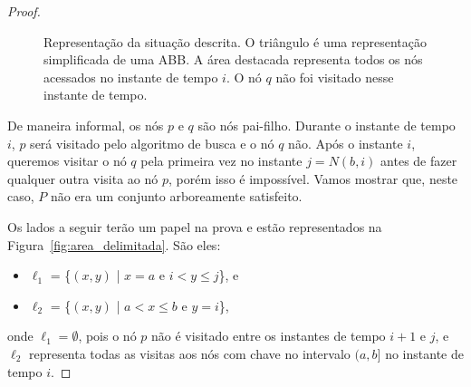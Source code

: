 \begin{proof}
\begin{figure}[H]
    \caption{Representação da situação descrita. O triângulo é uma representação simplificada de uma ABB. A área destacada representa todos os nós acessados no instante de tempo $i$. O nó $q$ não foi visitado nesse instante de tempo.}
\label{fig:representacao_grafica}
\end{figure}

De maneira informal, os nós $p$ e $q$ são nós pai-filho. Durante o instante de tempo $i$, $p$ será visitado pelo algoritmo de busca e o nó $q$ não. Após o instante $i$, queremos visitar o nó $q$ pela primeira vez no instante $j = N(b,i)$ antes de fazer qualquer outra visita ao nó $p$, porém isso é impossível. Vamos mostrar que, neste caso, $P$ não era um conjunto arboreamente satisfeito.

Os lados a seguir terão um papel na prova e estão representados na Figura~\ref{fig:area_delimitada}. São eles:
\begin{itemize}
    \item $\ell_1$ = \{$(x,y)$ | $x = a$ e $i < y \leq j$\}, e
    \item $\ell_2$ = \{$(x,y)$ | $a < x \leq b$ e $y = i$\},
\end{itemize}
onde $\ell_1 = \emptyset$, pois o nó $p$ não é visitado entre os instantes de tempo $i+1$ e $j$, e $\ell_2$ representa todas as visitas aos nós com chave no intervalo $(a,b]$ no instante de tempo $i$.


\end{proof}
